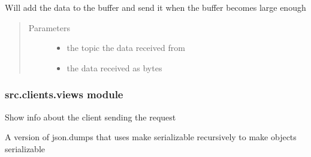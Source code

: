 \documentclass[letterpaper,10pt,english]{sphinxmanual}
\begin{document}
\begin{fulllineitems}
\begin{fulllineitems}
Will add the data to the buffer and send it when the buffer becomes large enough
\begin{quote}\begin{description}
\item[{Parameters}] \leavevmode\begin{itemize}
\item {} 
 \textendash{} the topic the data received from

\item {} 
 \textendash{} the data received as bytes

\end{itemize}

\end{description}\end{quote}

\end{fulllineitems}


\end{fulllineitems}



\subsubsection{src.clients.views module}
\label{\detokenize{src.clients:module-src.clients.views}}\label{\detokenize{src.clients:src-clients-views-module}}

\begin{fulllineitems}
\label{\detokenize{src.clients:src.clients.views.client}}
Show info about the client sending the request

\end{fulllineitems}


\begin{fulllineitems}
\label{\detokenize{src.clients:src.clients.views.dumps}}
A version of json.dumps that uses make serializable recursively to make objects serializable

\end{fulllineitems}
\end{document}
